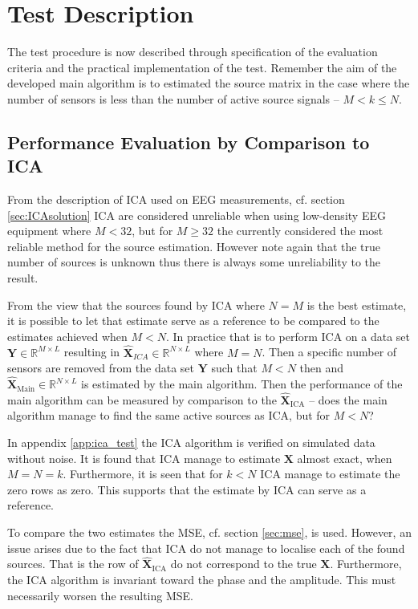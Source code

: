\section{Test Description}\label{seg:main_test_description}
The test procedure is now described through specification of the evaluation criteria and the practical implementation of the test.
Remember the aim of the developed main algorithm is to estimated the source matrix in the case where the number of sensors is less than the number of active source signals -- $M < k \leq N$.

\subsection{Performance Evaluation by Comparison to ICA}
From the description of ICA used on EEG measurements, cf. section \ref{sec:ICAsolution} ICA are considered unreliable when using low-density EEG equipment where $M<32$, but for $M \geq 32$ the currently considered the most reliable method for the source estimation. However note again that the true number of sources is unknown thus there is always some unreliability to the result. 

From the view that the sources found by ICA where $N=M$ is the best estimate, it is possible to let that estimate serve as a reference to be compared to the estimates achieved when $M<N$. 
In practice that is to perform ICA on a data set $\textbf{Y} \in \mathbb{R}^{M \times L}$ resulting in $\hat{\textbf{X}}_{ICA}\in \mathbb{R}^{N\times L}$ where $M=N$. 
Then a specific number of sensors are removed from the data set $\textbf{Y}$ such that $M<N$ then and $\hat{\textbf{X}}_{\text{Main}}\in \mathbb{R}^{N\times L}$ is estimated by the main algorithm. 
Then the performance of the main algorithm can be measured by comparison to the $\hat{\textbf{X}}_{\text{ICA}}$ -- does the main algorithm manage to find the same active sources as ICA, but for $M<N$?

In appendix \ref{app:ica_test} the ICA algorithm is verified on simulated data without noise. 
It is found that ICA manage to estimate $\textbf{X}$ almost exact, when $M=N=k$. 
Furthermore, it is seen that for $k < N$ ICA manage to estimate the zero rows as zero. This supports that the estimate by ICA can serve as a reference.     

To compare the two estimates the MSE, cf. section \ref{sec:mse}, is used. 
However, an issue arises due to the fact that ICA do not manage to localise each of the found sources. 
That is the row of $\hat{\textbf{X}}_{\text{ICA}}$ do not correspond to the true $\textbf{X}$. 
Furthermore, the ICA algorithm is invariant toward the phase and the amplitude. This must necessarily worsen the resulting MSE.  

